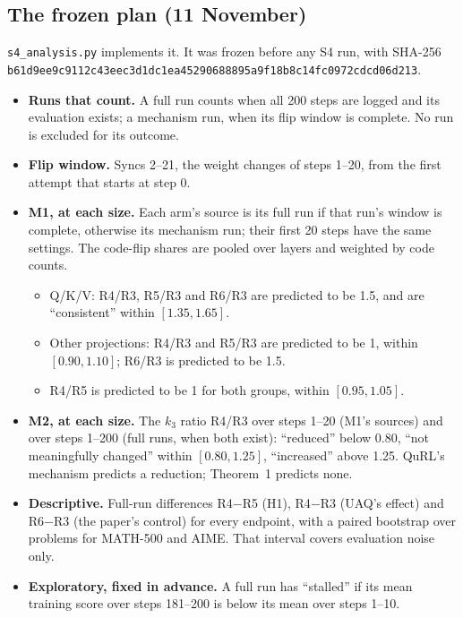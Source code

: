 \documentclass[11pt]{article}
\begin{document}
\subsection{The frozen plan (11 November)}
\texttt{s4\_analysis.py} implements it. It was frozen before any S4 run, with SHA-256 {\small\nolinkurl{b61d9ee9c9112c43eec3d1dc1ea45290688895a9f18b8c14fc0972cdcd06d213}}.
\begin{itemize}
\item \textbf{Runs that count.} A full run counts when all 200 steps are logged and its evaluation exists; a mechanism run, when its flip window is complete. No run is excluded for its outcome.
\item \textbf{Flip window.} Syncs 2--21, the weight changes of steps 1--20, from the first attempt that starts at step 0.
\item \textbf{M1, at each size.} Each arm's source is its full run if that run's window is complete, otherwise its mechanism run; their first 20 steps have the same settings. The code-flip shares are pooled over layers and weighted by code counts.
  \begin{itemize}
  \item Q/K/V: R4/R3, R5/R3 and R6/R3 are predicted to be 1.5, and are ``consistent'' within $[1.35,1.65]$.
  \item Other projections: R4/R3 and R5/R3 are predicted to be 1, within $[0.90,1.10]$; R6/R3 is predicted to be 1.5.
  \item R4/R5 is predicted to be 1 for both groups, within $[0.95,1.05]$.
  \end{itemize}
\item \textbf{M2, at each size.} The $k_3$ ratio R4/R3 over steps 1--20 (M1's sources) and over steps 1--200 (full runs, when both exist): ``reduced'' below 0.80, ``not meaningfully changed'' within $[0.80,1.25]$, ``increased'' above 1.25. QuRL's mechanism predicts a reduction; Theorem~1 predicts none.
\item \textbf{Descriptive.} Full-run differences R4$-$R5 (H1), R4$-$R3 (UAQ's effect) and R6$-$R3 (the paper's control) for every endpoint, with a paired bootstrap over problems for MATH-500 and AIME. That interval covers evaluation noise only.
\item \textbf{Exploratory, fixed in advance.} A full run has ``stalled'' if its mean training score over steps 181--200 is below its mean over steps 1--10.
\end{itemize}
\end{document}

